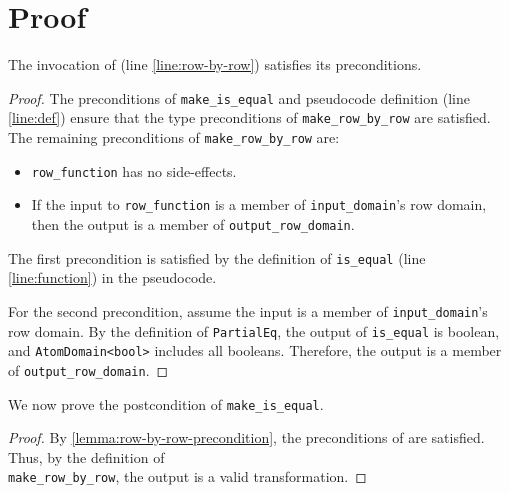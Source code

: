 \documentclass{article}
\begin{document}
\section{Proof}

\begin{lemma}
    The invocation of  (line \ref{line:row-by-row}) satisfies its preconditions.
\end{lemma}

\begin{proof}
    \label{lemma:row-by-row-precondition}
    The preconditions of \texttt{make\_is\_equal} and pseudocode definition (line \ref{line:def}) ensure that the type preconditions of \texttt{make\_row\_by\_row} are satisfied.
    The remaining preconditions of \texttt{make\_row\_by\_row} are:
    \begin{itemize}
        \item \texttt{row\_function} has no side-effects.
        \item If the input to \texttt{row\_function} is a member of \texttt{input\_domain}'s row domain, then the output is a member of \texttt{output\_row\_domain}.
    \end{itemize}

    The first precondition is satisfied by the definition of \texttt{is\_equal} (line \ref{line:function}) in the pseudocode.

    For the second precondition, assume the input is a member of \texttt{input\_domain}'s row domain.
    By the definition of \texttt{PartialEq}, the output of \texttt{is\_equal} is boolean, and \texttt{AtomDomain<bool>} includes all booleans.
    Therefore, the output is a member of \texttt{output\_row\_domain}.
\end{proof}

We now prove the postcondition of \texttt{make\_is\_equal}.
\begin{proof}
By \ref{lemma:row-by-row-precondition}, the preconditions of  are satisfied.
Thus, by the definition of \\\texttt{make\_row\_by\_row}, the output is a valid transformation.
\end{proof}
\end{document}
